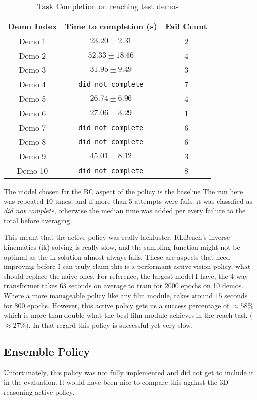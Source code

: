 \begin{table}[ht]
\centering
  \begin{tabular}{| c | c | c |}
  \hline
  Demo Index & Time to completion (s) & Fail Count\\
  \hline
  Demo 1  &  \(23.20 \pm 2.31\) & 2 \\
  Demo 2  &  \(52.33 \pm 18.66\) & 4 \\
  Demo 3  &  \(31.95 \pm 9.49\) & 3 \\
  Demo 4  &  \texttt{did not complete} & 7 \\
  Demo 5  &  \(26.74 \pm 6.96\)  & 4 \\
  Demo 6  &  \(27.06 \pm 3.29\) & 1 \\
  Demo 7  &  \texttt{did not complete} & 6 \\
  Demo 8  &  \texttt{did not complete} & 6 \\
  Demo 9  &  \(45.01 \pm 8.12\) & 3 \\
  Demo 10  &  \texttt{did not complete} & 8 \\
  \hline
  \end{tabular}\caption{Task Completion on reaching test demos}\label{tab:appl-first-times}
\end{table}
The model chosen for the BC aspect of the policy is the baseline
The run here was repeated 10 times, and if more than 5 attempts were fails, it was classified as \emph{did not complete}, otherwise the median time was added per every failure to the total before averaging. 

This meant that the active policy was really lackluster. RLBench's inverse kinematics (ik) solving is really slow, and the sampling function might not be optimal as the ik solution almost always fails. These are aspects that need improving before I can truly claim this is a performant active vision policy, what should replace the naive ones. For reference, the largest model I have, the 4-way transformer takes $63$ seconds on average to train for $2000$ epochs on 10 demos. Where a more manageable policy like any film module, takes around $15$ seconds for $800$ epochs. 
However, this active policy gets us a success percentage of $\approx 58\%$ which is more than double what the best film module achieves in the reach task ($\approx 27\%)$. In that regard this policy is successful yet very slow.


\subsection{Ensemble Policy}
Unfortunately, this policy was not fully implemented and did not get to include it in the evaluation. It would have been nice to compare this against the 3D reasoning active policy.

